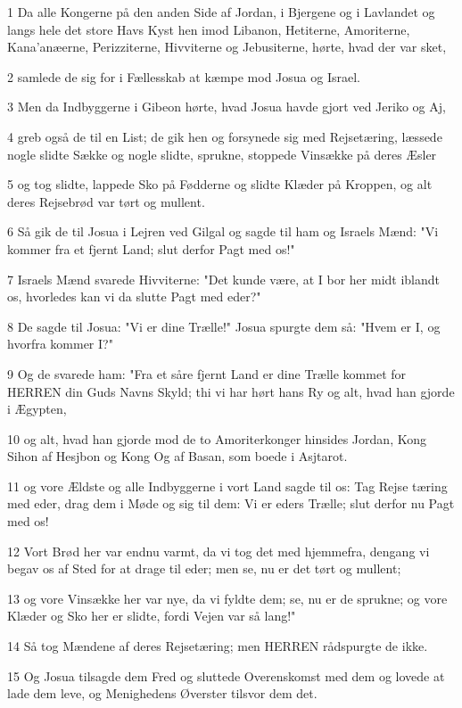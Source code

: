 \par 1 Da alle Kongerne på den anden Side af Jordan, i Bjergene og i Lavlandet og langs hele det store Havs Kyst hen imod Libanon, Hetiterne, Amoriterne, Kana'anæerne, Perizziterne, Hivviterne og Jebusiterne, hørte, hvad der var sket,
\par 2 samlede de sig for i Fællesskab at kæmpe mod Josua og Israel.
\par 3 Men da Indbyggerne i Gibeon hørte, hvad Josua havde gjort ved Jeriko og Aj,
\par 4 greb også de til en List; de gik hen og forsynede sig med Rejsetæring, læssede nogle slidte Sække og nogle slidte, sprukne, stoppede Vinsække på deres Æsler
\par 5 og tog slidte, lappede Sko på Fødderne og slidte Klæder på Kroppen, og alt deres Rejsebrød var tørt og mullent.
\par 6 Så gik de til Josua i Lejren ved Gilgal og sagde til ham og Israels Mænd: "Vi kommer fra et fjernt Land; slut derfor Pagt med os!"
\par 7 Israels Mænd svarede Hivviterne: "Det kunde være, at I bor her midt iblandt os, hvorledes kan vi da slutte Pagt med eder?"
\par 8 De sagde til Josua: "Vi er dine Trælle!" Josua spurgte dem så: "Hvem er I, og hvorfra kommer I?"
\par 9 Og de svarede ham: "Fra et såre fjernt Land er dine Trælle kommet for HERREN din Guds Navns Skyld; thi vi har hørt hans Ry og alt, hvad han gjorde i Ægypten,
\par 10 og alt, hvad han gjorde mod de to Amoriterkonger hinsides Jordan, Kong Sihon af Hesjbon og Kong Og af Basan, som boede i Asjtarot.
\par 11 og vore Ældste og alle Indbyggerne i vort Land sagde til os: Tag Rejse tæring med eder, drag dem i Møde og sig til dem: Vi er eders Trælle; slut derfor nu Pagt med os!
\par 12 Vort Brød her var endnu varmt, da vi tog det med hjemmefra, dengang vi begav os af Sted for at drage til eder; men se, nu er det tørt og mullent;
\par 13 og vore Vinsække her var nye, da vi fyldte dem; se, nu er de sprukne; og vore Klæder og Sko her er slidte, fordi Vejen var så lang!"
\par 14 Så tog Mændene af deres Rejsetæring; men HERREN rådspurgte de ikke.
\par 15 Og Josua tilsagde dem Fred og sluttede Overenskomst med dem og lovede at lade dem leve, og Menighedens Øverster tilsvor dem det.
